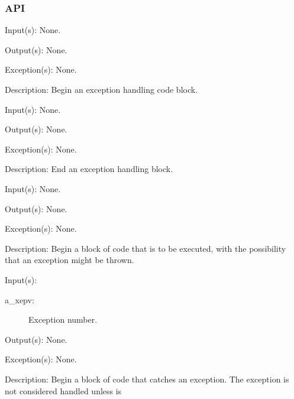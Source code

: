 \subsubsection{API}
\begin{capi}
\label{xep_begin}
	\begin{capilist}
	\item[Input(s): ] None.
	\item[Output(s): ] None.
	\item[Exception(s): ] None.
	\item[Description: ]
		Begin an exception handling code block.
	\end{capilist}
\label{xep_end}
	\begin{capilist}
	\item[Input(s): ] None.
	\item[Output(s): ] None.
	\item[Exception(s): ] None.
	\item[Description: ]
		End an exception handling block.
	\end{capilist}
\label{xep_try}
	\begin{capilist}
	\item[Input(s): ] None.
	\item[Output(s): ] None.
	\item[Exception(s): ] None.
	\item[Description: ]
		Begin a block of code that is to be executed, with the
		possibility that an exception might be thrown.
	\end{capilist}
\label{xep_catch}
	\begin{capilist}
	\item[Input(s): ]
		\begin{description}\item[]
		\item[a\_xepv: ]
			Exception number.
		\end{description}
	\item[Output(s): ] None.
	\item[Exception(s): ] None.
	\item[Description: ]
		Begin a block of code that catches an exception.  The exception
		is not considered handled unless  is

\end{capilist}
\end{capi}
